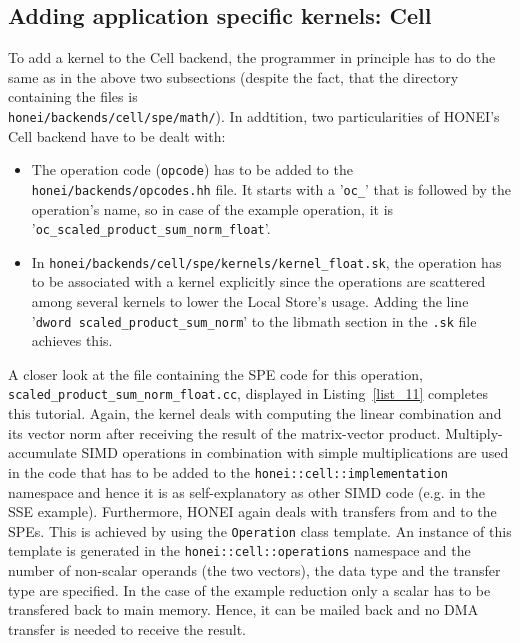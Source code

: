 \documentclass{article}
\begin{document}
\FloatBarrier
\subsection{Adding application specific kernels: Cell}\label{sec:cell}
To add a kernel to the Cell backend, the programmer in principle has to do the same as in the above two subsections (despite the fact, that the directory containing the files is \\ \texttt{honei/backends/cell/spe/math/}). In addtition, two particularities of HONEI's Cell backend have to be dealt with:
\begin{itemize}
\item{The operation code (\texttt{opcode}) has to be added to the \texttt{honei/backends/opcodes.hh} file. It starts with a '\texttt{oc\_}' that is followed by the operation's name, so in case of the example operation, it is '\texttt{oc\_scaled\_product\_sum\_norm\_float}'.}
\item{In \texttt{honei/backends/cell/spe/kernels/kernel\_float.sk}, the operation has to be associated with a kernel explicitly since the operations are scattered among several kernels to lower the Local Store's usage. Adding the line '\texttt{dword scaled\_product\_sum\_norm}' to the libmath section in the \texttt{.sk} file achieves this.}
\end{itemize}

A closer look at the file containing the SPE code for this operation,\\ \texttt{scaled\_product\_sum\_norm\_float.cc}, displayed in Listing~\ref{list_11}
completes this tutorial. Again, the kernel deals with computing the linear combination and its vector norm after receiving the result of the matrix-vector product. Multiply-accumulate SIMD operations in combination with simple multiplications are used in the code that has to be added to the \texttt{honei::cell::implementation} namespace and hence it is as self-explanatory as other SIMD code (e.g. in the SSE example). Furthermore, HONEI again deals with transfers from and to the SPEs. This is achieved by using the \texttt{Operation} class template. An instance of this template is generated in the \texttt{honei::cell::operations} namespace and the number of non-scalar operands (the two vectors), the data type and the transfer type are specified. In the case of the example reduction only a scalar has to be transfered back to main memory. Hence, it can be mailed back and no DMA transfer is needed to receive the result.
\end{document}
